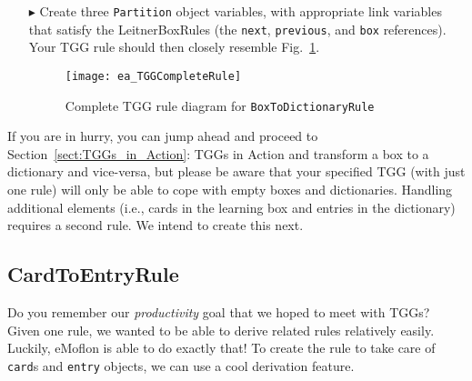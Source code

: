 \begin{enumerate}
\item[$\blacktriangleright$] Create three \texttt{Partition} object variables, with appropriate link variables that satisfy the LeitnerBoxRules (the
\texttt{next}, \texttt{previous}, and \texttt{box} references). Your TGG rule should then closely resemble Fig.~\ref{fig:boxtodictionaryrule_complete}.


\begin{figure}[htbp]
\begin{center}
  \texttt{[image: ea\_TGGCompleteRule]}
  \caption{Complete TGG rule diagram for \texttt{BoxToDictionaryRule}}
  \label{fig:boxtodictionaryrule_complete}
\end{center}
\end{figure}

\end{enumerate}


If you are in hurry, you can jump ahead and proceed to Section~\ref{sect:TGGs_in_Action}: TGGs in Action and transform a box to a dictionary and vice-versa, but
please be aware that your specified TGG (with just one rule) will only be able to cope with empty boxes and dictionaries. Handling additional elements
(i.e., cards in the learning box and entries in the dictionary) requires a second rule. We intend to create this next.

\newpage
\subsection{CardToEntryRule}

Do you remember our \emph{productivity} goal that we hoped to meet with TGGs? Given one rule, we wanted to be able to derive related rules relatively easily.
Luckily, eMoflon is able to do exactly that! To create the rule to take care of \texttt{card}s and \texttt{entry} objects, we can use a cool derivation
feature.

